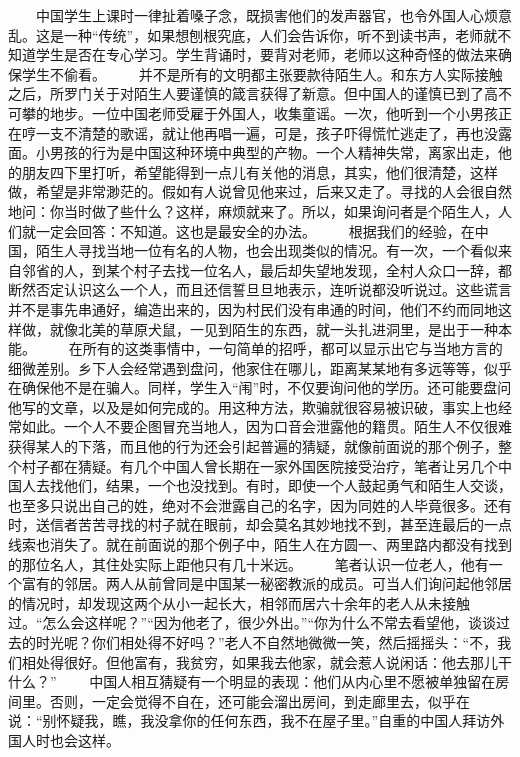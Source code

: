 \documentclass[12pt,oneside]{book}
\begin{document}
\begin{common-format}
　　中国学生上课时一律扯着嗓子念，既损害他们的发声器官，也令外国人心烦意乱。这是一种“传统”，如果想刨根究底，人们会告诉你，听不到读书声，老师就不知道学生是否在专心学习。学生背诵时，要背对老师，老师以这种奇怪的做法来确保学生不偷看。 
　　并不是所有的文明都主张要款待陌生人。和东方人实际接触之后，所罗门关于对陌生人要谨慎的箴言获得了新意。但中国人的谨慎已到了高不可攀的地步。一位中国老师受雇于外国人，收集童谣。一次，他听到一个小男孩正在哼一支不清楚的歌谣，就让他再唱一遍，可是，孩子吓得慌忙逃走了，再也没露面。小男孩的行为是中国这种环境中典型的产物。一个人精神失常，离家出走，他的朋友四下里打听，希望能得到一点儿有关他的消息，其实，他们很清楚，这样做，希望是非常渺茫的。假如有人说曾见他来过，后来又走了。寻找的人会很自然地问：你当时做了些什么？这样，麻烦就来了。所以，如果询问者是个陌生人，人们就一定会回答：不知道。这也是最安全的办法。 
　　根据我们的经验，在中国，陌生人寻找当地一位有名的人物，也会出现类似的情况。有一次，一个看似来自邻省的人，到某个村子去找一位名人，最后却失望地发现，全村人众口一辞，都断然否定认识这么一个人，而且还信誓旦旦地表示，连听说都没听说过。这些谎言并不是事先串通好，编造出来的，因为村民们没有串通的时间，他们不约而同地这样做，就像北美的草原犬鼠，一见到陌生的东西，就一头扎进洞里，是出于一种本能。 
　　在所有的这类事情中，一句简单的招呼，都可以显示出它与当地方言的细微差别。乡下人会经常遇到盘问，他家住在哪儿，距离某某地有多远等等，似乎在确保他不是在骗人。同样，学生入“闱”时，不仅要询问他的学历。还可能要盘问他写的文章，以及是如何完成的。用这种方法，欺骗就很容易被识破，事实上也经常如此。一个人不要企图冒充当地人，因为口音会泄露他的籍贯。陌生人不仅很难获得某人的下落，而且他的行为还会引起普遍的猜疑，就像前面说的那个例子，整个村子都在猜疑。有几个中国人曾长期在一家外国医院接受治疗，笔者让另几个中国人去找他们，结果，一个也没找到。有时，即使一个人鼓起勇气和陌生人交谈，也至多只说出自己的姓，绝对不会泄露自己的名字，因为同姓的人毕竟很多。还有时，送信者苦苦寻找的村子就在眼前，却会莫名其妙地找不到，甚至连最后的一点线索也消失了。就在前面说的那个例子中，陌生人在方圆一、两里路内都没有找到的那位名人，其住处实际上距他只有几十米远。 
　　笔者认识一位老人，他有一个富有的邻居。两人从前曾同是中国某一秘密教派的成员。可当人们询问起他邻居的情况时，却发现这两个从小一起长大，相邻而居六十余年的老人从未接触过。“怎么会这样呢？”“因为他老了，很少外出。”“你为什么不常去看望他，谈谈过去的时光呢？你们相处得不好吗？”老人不自然地微微一笑，然后摇摇头：“不，我们相处得很好。但他富有，我贫穷，如果我去他家，就会惹人说闲话：他去那儿干什么？” 
　　中国人相互猜疑有一个明显的表现：他们从内心里不愿被单独留在房间里。否则，一定会觉得不自在，还可能会溜出房间，到走廊里去，似乎在说：“别怀疑我，瞧，我没拿你的任何东西，我不在屋子里。”自重的中国人拜访外国人时也会这样。 

\end{common-format}
\end{document}
